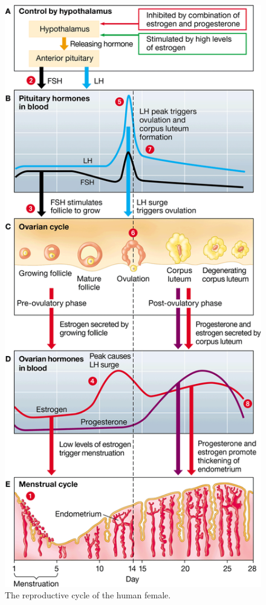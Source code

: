 \documentclass{article}
\begin{document}
\begin{figure}
	\centering
	\includegraphics[width=\linewidth]{reproductive_cycle_hormonal_control.png}
	\caption{The reproductive cycle of the human female.}
\end{figure}
\end{document}
